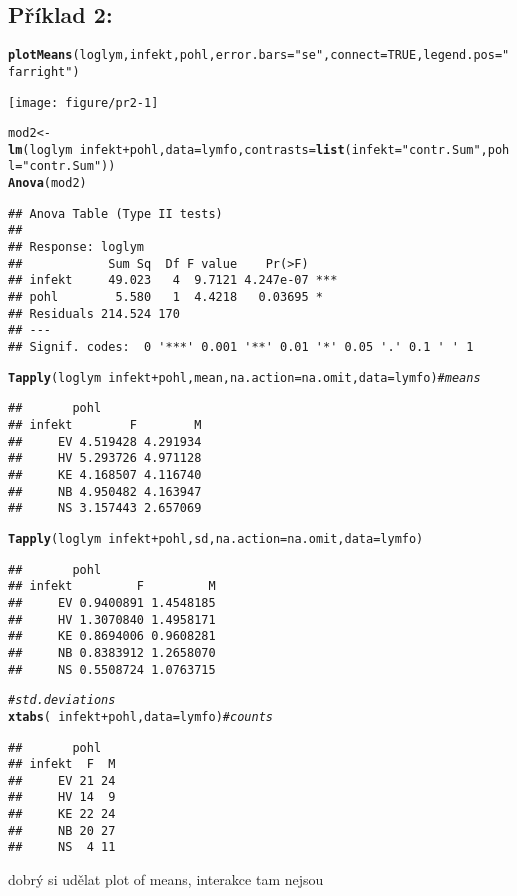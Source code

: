\documentclass[twoside]{article}\usepackage[]{graphicx}\usepackage[]{color}
\makeatletter
\def\maxwidth{ %
  \ifdim\Gin@nat@width>\linewidth
    \linewidth
  \else
    \Gin@nat@width
  \fi
}
\newcommand{\hlnum}[1]{\textcolor[rgb]{0.686,0.059,0.569}{#1}}%
\newcommand{\hlstr}[1]{\textcolor[rgb]{0.192,0.494,0.8}{#1}}%
\newcommand{\hlcom}[1]{\textcolor[rgb]{0.678,0.584,0.686}{\textit{#1}}}%
\newcommand{\hlopt}[1]{\textcolor[rgb]{0,0,0}{#1}}%
\newcommand{\hlstd}[1]{\textcolor[rgb]{0.345,0.345,0.345}{#1}}%
\newcommand{\hlkwb}[1]{\textcolor[rgb]{0.69,0.353,0.396}{#1}}%
\newcommand{\hlkwc}[1]{\textcolor[rgb]{0.333,0.667,0.333}{#1}}%
\newcommand{\hlkwd}[1]{\textcolor[rgb]{0.737,0.353,0.396}{\textbf{#1}}}%
\newenvironment{kframe}{%
 \def\at@end@of@kframe{}%
 \ifinner\ifhmode%
  \def\at@end@of@kframe{\end{minipage}}%
  \begin{minipage}{\columnwidth}%
 \fi\fi%
 \def\FrameCommand##1{\hskip\@totalleftmargin \hskip-\fboxsep
 \colorbox{shadecolor}{##1}\hskip-\fboxsep
     \hskip-\linewidth \hskip-\@totalleftmargin \hskip\columnwidth}%
 \MakeFramed {\advance\hsize-\width
   \@totalleftmargin\z@ \linewidth\hsize
   \@setminipage}}%
 {\par\unskip\endMakeFramed%
 \at@end@of@kframe}
\newenvironment{knitrout}{}{} %
\makeatother
\begin{document}
\subsection*{Příklad 2:}
\begin{knitrout}
\color{fgcolor}\begin{kframe}
\begin{alltt}
\hlkwd{plotMeans}\hlstd{(loglym, infekt, pohl,} \hlkwc{error.bars}\hlstd{=}\hlstr{"se"}\hlstd{,} \hlkwc{connect}\hlstd{=}\hlnum{TRUE}\hlstd{,} \hlkwc{legend.pos}\hlstd{=}\hlstr{"farright"}\hlstd{)}
\end{alltt}
\end{kframe}
\texttt{[image: figure/pr2-1]} 
\begin{kframe}\begin{alltt}
\hlstd{mod2} \hlkwb{<-} \hlkwd{lm}\hlstd{(loglym} \hlopt{~} \hlstd{infekt}\hlopt{+}\hlstd{pohl,} \hlkwc{data}\hlstd{=lymfo,} \hlkwc{contrasts}\hlstd{=}\hlkwd{list}\hlstd{(}\hlkwc{infekt}\hlstd{=}\hlstr{"contr.Sum"}\hlstd{,} \hlkwc{pohl}\hlstd{=}\hlstr{"contr.Sum"}\hlstd{))}
\hlkwd{Anova}\hlstd{(mod2)}
\end{alltt}
\begin{verbatim}
## Anova Table (Type II tests)
## 
## Response: loglym
##            Sum Sq  Df F value    Pr(>F)    
## infekt     49.023   4  9.7121 4.247e-07 ***
## pohl        5.580   1  4.4218   0.03695 *  
## Residuals 214.524 170                      
## ---
## Signif. codes:  0 '***' 0.001 '**' 0.01 '*' 0.05 '.' 0.1 ' ' 1
\end{verbatim}
\begin{alltt}
\hlkwd{Tapply}\hlstd{(loglym} \hlopt{~} \hlstd{infekt} \hlopt{+} \hlstd{pohl, mean,} \hlkwc{na.action}\hlstd{=na.omit,} \hlkwc{data}\hlstd{=lymfo)} \hlcom{# means}
\end{alltt}
\begin{verbatim}
##       pohl
## infekt        F        M
##     EV 4.519428 4.291934
##     HV 5.293726 4.971128
##     KE 4.168507 4.116740
##     NB 4.950482 4.163947
##     NS 3.157443 2.657069
\end{verbatim}
\begin{alltt}
\hlkwd{Tapply}\hlstd{(loglym} \hlopt{~} \hlstd{infekt} \hlopt{+} \hlstd{pohl, sd,} \hlkwc{na.action}\hlstd{=na.omit,} \hlkwc{data}\hlstd{=lymfo)}
\end{alltt}
\begin{verbatim}
##       pohl
## infekt         F         M
##     EV 0.9400891 1.4548185
##     HV 1.3070840 1.4958171
##     KE 0.8694006 0.9608281
##     NB 0.8383912 1.2658070
##     NS 0.5508724 1.0763715
\end{verbatim}
\begin{alltt}
  \hlcom{# std. deviations}
\hlkwd{xtabs}\hlstd{(}\hlopt{~} \hlstd{infekt} \hlopt{+} \hlstd{pohl,} \hlkwc{data}\hlstd{=lymfo)} \hlcom{# counts}
\end{alltt}
\begin{verbatim}
##       pohl
## infekt  F  M
##     EV 21 24
##     HV 14  9
##     KE 22 24
##     NB 20 27
##     NS  4 11
\end{verbatim}
\end{kframe}
\end{knitrout}
dobrý si udělat plot of means, interakce tam nejsou
\end{document}
